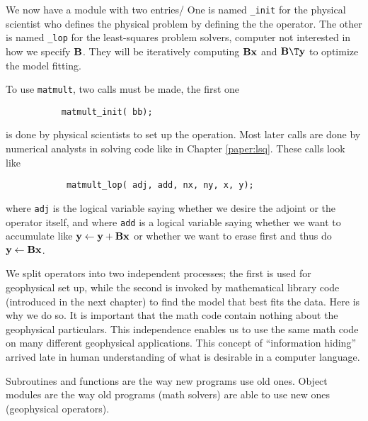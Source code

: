 We now have a module with two entries/
One is named {\tt \_init} 
for the physical scientist who defines the physical problem by
defining the the operator.
The other is named {\tt \_lop} 
for the least-squares problem solvers,
computer not interested
in how we specify $\bold B$. They will be iteratively computing
$\bold B\bold x$ and $\bold B\T \bold y$
to optimize the model fitting.
\begin{comment}
The lines beginning with {\tt {\#}{\%}} are expanded by Loptran into
more verbose and distracting Fortran 90 code.
The second line in the module \texttt{matmult},
however,
is pure Fortran syntax saying that
{\tt bb} is a pointer to a real-valued matrix.
\end{comment}
\par
To use \texttt{matmult}, two calls must be made,
the first one
\begin{verbatim}
           matmult_init( bb);
\end{verbatim}
is done by physical scientists to set up the operation.
Most later calls are done by numerical analysts
in solving code like in Chapter \ref{paper:lsq}.
These calls look like
\begin{verbatim}
            matmult_lop( adj, add, nx, ny, x, y);
\end{verbatim}
where {\tt adj} is the logical variable saying whether we desire
the adjoint or the operator itself,
and where {\tt add} is a logical variable saying
whether we want to accumulate like
$\bold y \leftarrow \bold y+\bold B\bold x$
or whether we want to erase first and thus do
$\bold y \leftarrow \bold B\bold x$.
\begin{comment}
The return value {\tt stat} is an integer parameter,
mostly useless (unless you want to use it for error codes). 
\par
Operator initialization often allocates memory.
To release this memory, you can {\tt call matmult\_close()}
although in this case nothing really happens.
\end{comment}
\par
We split operators into two independent processes;
the first is used for geophysical set up,
while the second is invoked by mathematical library code
(introduced in the next chapter)
to find the model that best fits the data.
Here is why we do so.
It is important that the math code contain nothing about
the geophysical particulars.  This independence enables us to use
the same math code on many different geophysical applications.
This concept of ``information hiding'' arrived late in
human understanding of what is desirable in a computer language.
\begin{comment}
This feature alone is valuable enough to warrant
upgrading from Fortran 77 to Fortran 90, and likewise from C to C++.
\end{comment}
Subroutines and functions are the way new programs use old ones.
Object modules are the way old programs (math solvers)
are able to use new ones (geophysical operators).


